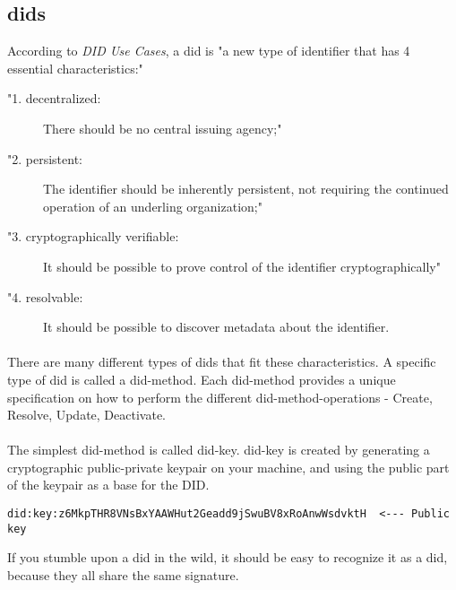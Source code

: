 \newpage




\subsection{\acrfull{dids}} 

According to \textit{DID Use Cases}\cite{DIDUseCases}, a \acrshort{did} is "a new type of identifier that has 4 essential characteristics:"
\begin{description}
    \item["1. decentralized:] There should be no central issuing agency;"
    \item["2. persistent:] The identifier should be inherently persistent, not requiring the continued operation of an underling organization;"
    \item["3. cryptographically verifiable:] It should be possible to prove control of the identifier cryptographically"
    \item["4. resolvable:] It should be possible to discover metadata about the identifier.
\end{description}
    
\paragraph{}
There are many different types of \acrshort{dids} that fit these characteristics. A specific type of \acrshort{did} is called a \gls{did-method}\cite{DIDMethod}. Each \gls{did-method} provides a unique specification on how to perform the different \gls{did-method-operations}\cite{DIDMethodOperations} - Create, Resolve, Update, Deactivate. 

\paragraph{}
The simplest \gls{did-method} is called \gls{did-key}\cite{DIDKey}. \gls{did-key} is created by generating a cryptographic public-private keypair on your machine, and using the public part of the keypair as a base for the DID.

\begin{lstlisting}[caption={Example of a \gls{did-key}}]
did:key:z6MkpTHR8VNsBxYAAWHut2Geadd9jSwuBV8xRoAnwWsdvktH  <--- Public key
\end{lstlisting}

If you stumble upon a \acrshort{did} in the wild, it should be easy to recognize it as a \acrshort{did}, because they all share the same signature.

